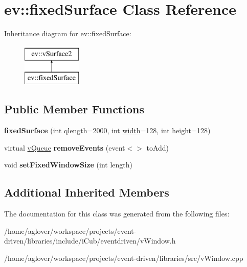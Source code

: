 \hypertarget{classev_1_1fixedSurface}{}\section{ev\+:\+:fixed\+Surface Class Reference}
\label{classev_1_1fixedSurface}
Inheritance diagram for ev\+:\+:fixed\+Surface\+:\begin{figure}[H]
\begin{center}
\leavevmode
\includegraphics[height=2.000000cm]{classev_1_1fixedSurface}
\end{center}
\end{figure}
\subsection*{Public Member Functions}
\begin{DoxyCompactItemize}
\item 
{\bfseries fixed\+Surface} (int qlength=2000, int \hyperlink{classev_1_1vSurface2_a1aa8027816352a15d5b9bf1f26f48e76}{width}=128, int height=128)\hypertarget{classev_1_1fixedSurface_adee898e7c65c9c8d41fd20530d9f10b0}{}\label{classev_1_1fixedSurface_adee898e7c65c9c8d41fd20530d9f10b0}

\item 
virtual \hyperlink{classev_1_1vQueue}{v\+Queue} {\bfseries remove\+Events} (event$<$$>$ to\+Add)\hypertarget{classev_1_1fixedSurface_ace012acf57456f71d77fc7a349a915d7}{}\label{classev_1_1fixedSurface_ace012acf57456f71d77fc7a349a915d7}

\item 
void {\bfseries set\+Fixed\+Window\+Size} (int length)\hypertarget{classev_1_1fixedSurface_ac8249b63b5ada0491d6a6ff70b745488}{}\label{classev_1_1fixedSurface_ac8249b63b5ada0491d6a6ff70b745488}

\end{DoxyCompactItemize}
\subsection*{Additional Inherited Members}


The documentation for this class was generated from the following files\+:\begin{DoxyCompactItemize}
\item 
/home/aglover/workspace/projects/event-\/driven/libraries/include/i\+Cub/eventdriven/v\+Window.\+h\item 
/home/aglover/workspace/projects/event-\/driven/libraries/src/v\+Window.\+cpp\end{DoxyCompactItemize}
